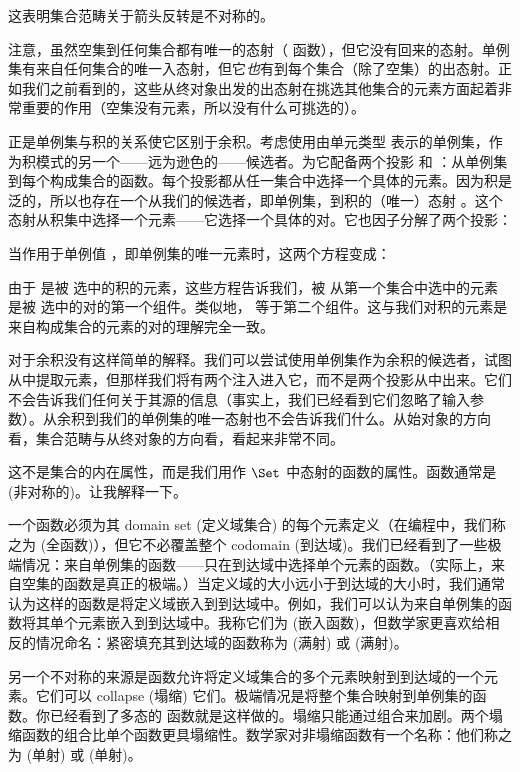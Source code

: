 这表明集合范畴关于箭头反转是不对称的。

注意，虽然空集到任何集合都有唯一的态射（ 函数），但它没有回来的态射。单例集有来自任何集合的唯一入态射，但它\emph{也}有到每个集合（除了空集）的出态射。正如我们之前看到的，这些从终对象出发的出态射在挑选其他集合的元素方面起着非常重要的作用（空集没有元素，所以没有什么可挑选的）。

正是单例集与积的关系使它区别于余积。考虑使用由单元类型 \code{()} 表示的单例集，作为积模式的另一个——远为逊色的——候选者。为它配备两个投影  和 ：从单例集到每个构成集合的函数。每个投影都从任一集合中选择一个具体的元素。因为积是泛的，所以也存在一个从我们的候选者，即单例集，到积的（唯一）态射 。这个态射从积集中选择一个元素——它选择一个具体的对。它也因子分解了两个投影：

当作用于单例值 \code{()}，即单例集的唯一元素时，这两个方程变成：

由于  是被  选中的积的元素，这些方程告诉我们，被  从第一个集合中选中的元素  是被  选中的对的第一个组件。类似地， 等于第二个组件。这与我们对积的元素是来自构成集合的元素的对的理解完全一致。

对于余积没有这样简单的解释。我们可以尝试使用单例集作为余积的候选者，试图从中提取元素，但那样我们将有两个注入进入它，而不是两个投影从中出来。它们不会告诉我们任何关于其源的信息（事实上，我们已经看到它们忽略了输入参数）。从余积到我们的单例集的唯一态射也不会告诉我们什么。从始对象的方向看，集合范畴与从终对象的方向看，看起来非常不同。

这不是集合的内在属性，而是我们用作 $\Set$ 中态射的函数的属性。函数通常是  (非对称的)。让我解释一下。

一个函数必须为其 domain set (定义域集合) 的每个元素定义（在编程中，我们称之为  (全函数)），但它不必覆盖整个 codomain (到达域)。我们已经看到了一些极端情况：来自单例集的函数——只在到达域中选择单个元素的函数。（实际上，来自空集的函数是真正的极端。）当定义域的大小远小于到达域的大小时，我们通常认为这样的函数是将定义域嵌入到到达域中。例如，我们可以认为来自单例集的函数将其单个元素嵌入到到达域中。我称它们为  (嵌入函数)，但数学家更喜欢给相反的情况命名：紧密填充其到达域的函数称为  (满射) 或  (满射)。

另一个不对称的来源是函数允许将定义域集合的多个元素映射到到达域的一个元素。它们可以 collapse (塌缩) 它们。极端情况是将整个集合映射到单例集的函数。你已经看到了多态的  函数就是这样做的。塌缩只能通过组合来加剧。两个塌缩函数的组合比单个函数更具塌缩性。数学家对非塌缩函数有一个名称：他们称之为  (单射) 或  (单射)。

